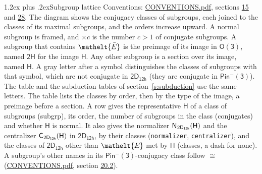 \documentclass[10pt,a4paper]{article}
\makeatletter
\renewcommand\section{\@startsection{section}{1}{\z@}{-3ex plus -1ex minus -.2ex}%
  {1.2ex plus .2ex}{\normalfont\large\sffamily\bfseries\color{parttitle}}}
\numberwithin{equation}{section}
\newcommand{\eltfont}[1]{{\let\sigma\eltsigma\mathelt{#1}}}
\newcommand{\grp}[1]{\mathsf{#1}}
\newcommand{\cls}[1]{\eltfont{#1}}
\newcommand{\elt}[1]{\eltfont{#1}}
\newcommand{\samecls}{\cong}
\newcommand{\barred}[1]{\bar{#1}}
\newcommand{\hairsp}{\mkern1mu}
\makeatother
\begin{document}
\section{Subgroup lattice}\label{s:subgroups}
Conventions: \href{../../CONVENTIONS.pdf}{CONVENTIONS.pdf}, sections \href{../../../rotation/CONVENTIONS.pdf\#conv.15}{15} and \href{../../CONVENTIONS.pdf\#conv.28}{28}.
The diagram shows the conjugacy classes of subgroups, each joined to the classes of its maximal subgroups, and the orders increase upward. A normal subgroup is framed, and ${\times}c$ is the number $c > 1$ of conjugate subgroups. \label{n:group.H}A subgroup that contains $\elt{\barred{E}}$ is the preimage of its image in $\grp{O(3)}$, named $\grp{2H}$ for the image $\grp{H}$. Any other subgroup is a section over its image, named $\grp{H}$. A gray letter after a symbol distinguishes the classes of subgroups with that symbol, which are not conjugate in $\grp{2D_{12h}}$ (they are conjugate in \href{Pinminus3.pdf}{$\grp{Pin^{-}(3)}$}). The table and the subduction tables of section~\ref{s:subduction} use the same letters. The table lists the classes by order, then by the type of the image, a preimage before a section. \label{n:head.subgroup}\label{n:head.order}\label{n:head.conjugates}\label{n:head.normal}A row gives the representative $\grp{H}$ of a class of subgroups (subgrp), its order, the number of subgroups in the class (conjugates) and whether $\grp{H}$ is normal. \label{n:group.normalizer}\label{n:group.centralizer}\label{n:head.classes}It also gives the normalizer $\grp{N}_{\hairsp \grp{2D_{12h}}}(\grp{H})$ and the centralizer $\grp{C}_{\hairsp \grp{2D_{12h}}}(\grp{H})$ in $\grp{2D_{12h}}$, by their classes (\texttt{normalizer}, \texttt{centralizer}), and the classes of $\grp{2D_{12h}}$ other than $\cls{E}$ met by $\grp{H}$ (classes, a dash for none). A subgroup's other names in its \href{Pinminus3.pdf}{$\grp{Pin^{-}(3)}$}-conjugacy class follow $\samecls$ (\href{../../CONVENTIONS.pdf}{CONVENTIONS.pdf}, section \href{../../CONVENTIONS.pdf\#conv.20.2}{20.2}).
\end{document}
